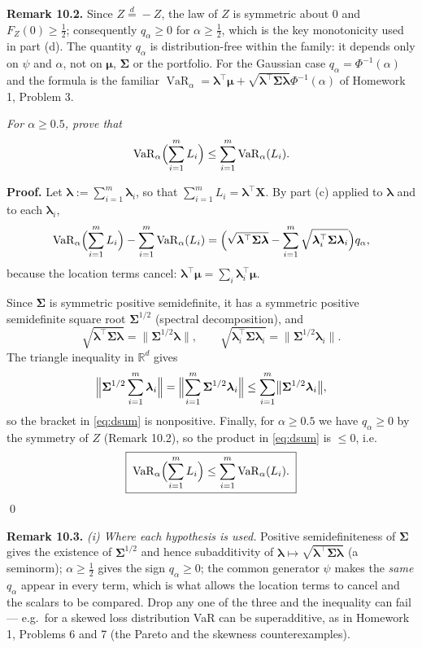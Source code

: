 \documentclass{MFM-hw} %
\newcommand{\VaR}{\operatorname{VaR}}
\newcommand{\real}{\mathbb{R}}
\newcommand{\bX}{\bm{X}}
\newcommand{\blambda}{\bm{\lambda}}
\newcommand{\bmu}{\bm{\mu}}
\newcommand{\bSigma}{\bm{\Sigma}}
\begin{document}
\smallskip
\noindent\textbf{Remark 10.2.} Since $Z\overset{d}{=}-Z$, the law of $Z$ is symmetric about $0$ and $F_Z(0)\ge\frac12$; consequently $q_\alpha\ge0$ for $\alpha\ge\frac12$, which is the key monotonicity used in part (d). The quantity $q_\alpha$ is distribution-free within the family: it depends only on $\psi$ and $\alpha$, not on $\bmu$, $\bSigma$ or the portfolio. For the Gaussian case $q_\alpha=\Phi^{-1}(\alpha)$ and the formula is the familiar $\VaR_\alpha=\blambda^\top\bmu+\sqrt{\blambda^\top\bSigma\blambda}\Phi^{-1}(\alpha)$ of Homework 1, Problem 3.

\HWsubproblem
\noindent\textit{For $\alpha\ge0.5$, prove that}
\[
    \VaR_\alpha\Bigl(\sum_{i=1}^m L_i\Bigr)\le\sum_{i=1}^m\VaR_\alpha(L_i).
\]

\medskip
\textbf{Proof.} Let $\blambda:=\sum_{i=1}^m\blambda_i$, so that $\sum_{i=1}^m L_i=\blambda^\top\bX$. By part (c) applied to $\blambda$ and to each $\blambda_i$,
\begin{equation}\label{eq:dsum}
    \VaR_\alpha\Bigl(\sum_{i=1}^m L_i\Bigr)-\sum_{i=1}^m\VaR_\alpha(L_i)
    =\Bigl(\sqrt{\blambda^\top\bSigma\blambda}-\sum_{i=1}^m\sqrt{\blambda_i^\top\bSigma\blambda_i}\Bigr)q_\alpha ,
\end{equation}
because the location terms cancel: $\blambda^\top\bmu=\sum_i\blambda_i^\top\bmu$.

Since $\bSigma$ is symmetric positive semidefinite, it has a symmetric positive semidefinite square root $\bSigma^{1/2}$ (spectral decomposition), and
\[
    \sqrt{\blambda^\top\bSigma\blambda}=\bigl\|\bSigma^{1/2}\blambda\bigr\|,\qquad
    \sqrt{\blambda_i^\top\bSigma\blambda_i}=\bigl\|\bSigma^{1/2}\blambda_i\bigr\| .
\]
The triangle inequality in $\real^d$ gives
\[
    \Bigl\|\bSigma^{1/2}\sum_{i=1}^m\blambda_i\Bigr\|
    =\Bigl\|\sum_{i=1}^m\bSigma^{1/2}\blambda_i\Bigr\|
    \le\sum_{i=1}^m\bigl\|\bSigma^{1/2}\blambda_i\bigr\|,
\]
so the bracket in \eqref{eq:dsum} is nonpositive. Finally, for $\alpha\ge0.5$ we have $q_\alpha\ge0$ by the symmetry of $Z$ (Remark 10.2), so the product in \eqref{eq:dsum} is $\le0$, i.e.
\[
    \boxed{\;\VaR_\alpha\Bigl(\sum_{i=1}^m L_i\Bigr)\le\sum_{i=1}^m\VaR_\alpha(L_i).\;}
\]
\qed

\smallskip
\noindent\textbf{Remark 10.3.} \emph{(i) Where each hypothesis is used.} Positive semidefiniteness of $\bSigma$ gives the existence of $\bSigma^{1/2}$ and hence subadditivity of $\blambda\mapsto\sqrt{\blambda^\top\bSigma\blambda}$ (a seminorm); $\alpha\ge\frac12$ gives the sign $q_\alpha\ge0$; the common generator $\psi$ makes the \emph{same} $q_\alpha$ appear in every term, which is what allows the location terms to cancel and the scalars to be compared. Drop any one of the three and the inequality can fail --- e.g.\ for a skewed loss distribution VaR can be superadditive, as in Homework 1, Problems 6 and 7 (the Pareto and the skewness counterexamples).
\end{document}
